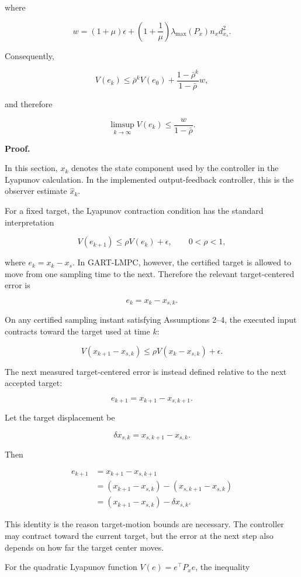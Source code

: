 \documentclass[11pt]{article}
\begin{document}
where

\[
w
=
(1+\mu)\epsilon
+
\left(1+\frac{1}{\mu}\right)
\lambda_{\max}(P_x)n_xd_{x_s}^2 .
\]

Consequently,

\[
V(e_k)
\le
\bar\rho^k V(e_0)
+
\frac{1-\bar\rho^k}{1-\bar\rho}w,
\]

and therefore

\[
\limsup_{k\to\infty}V(e_k)
\le
\frac{w}{1-\bar\rho}.
\]

\textbf{Proof.}

In this section, $x_k$ denotes the state component used by the controller in the Lyapunov calculation. In the implemented output-feedback controller, this is the observer estimate $\hat x_k$.


For a fixed target, the Lyapunov contraction condition has the standard interpretation


\[
V(e_{k+1})\le \rho V(e_k)+\epsilon,
\qquad
0<\rho<1,
\]

where $e_k=x_k-x_s$. In GART-LMPC, however, the certified target is allowed to move from one sampling time to the next. Therefore the relevant target-centered error is


\[
e_k = x_k-x_{s,k}.
\]

On any certified sampling instant satisfying Assumptions 2--4, the executed input contracts toward the target used at time $k$:


\[
V(x_{k+1}-x_{s,k})
\le
\rho V(x_k-x_{s,k})+\epsilon.
\]

The next measured target-centered error is instead defined relative to the next accepted target:


\[
e_{k+1}=x_{k+1}-x_{s,k+1}.
\]

Let the target displacement be


\[
\delta x_{s,k}=x_{s,k+1}-x_{s,k}.
\]

Then


\[
\begin{aligned}
e_{k+1}
&=x_{k+1}-x_{s,k+1} \\
&=(x_{k+1}-x_{s,k})-(x_{s,k+1}-x_{s,k}) \\
&=(x_{k+1}-x_{s,k})-\delta x_{s,k}.
\end{aligned}
\]

This identity is the reason target-motion bounds are necessary. The controller may contract toward the current target, but the error at the next step also depends on how far the target center moves.


For the quadratic Lyapunov function $V(e)=e^\top P_x e$, the inequality
\end{document}
